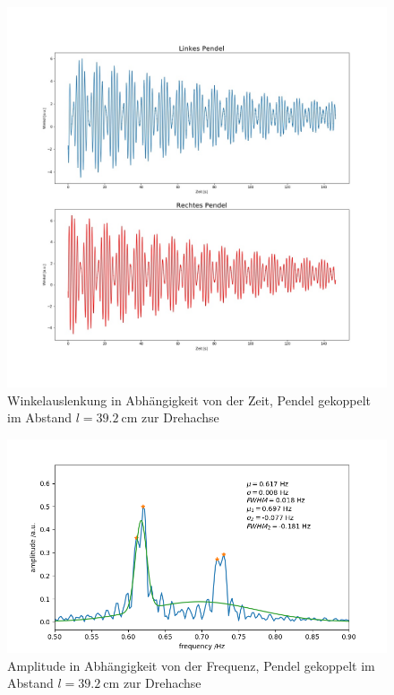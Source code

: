 \begin{figure}[H]
	\centering
	\includegraphics[height = 0.5 \textheight]{figures/211-21.jpeg}
	\caption{Winkelauslenkung in Abhängigkeit von der Zeit, Pendel gekoppelt im Abstand $l = \SI{39,2}{\cm}$ zur Drehachse}
\end{figure}
\begin{figure}[H]
	\centering
	\includegraphics[height = 0.23 \textheight]{figures/211-22.jpeg}
	\caption{Amplitude in Abhängigkeit von der Frequenz, Pendel gekoppelt im Abstand $l = \SI{39,2}{\cm}$ zur Drehachse}
\end{figure}



